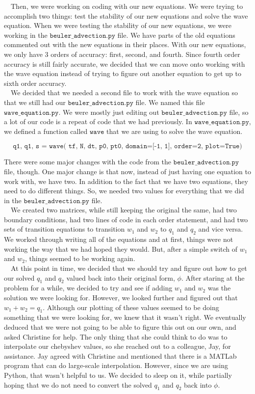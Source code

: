 \documentclass[12pt]{article}
\begin{document}
$\quad$Then, we were working on coding with our new equations. We were trying to accomplish two things: test the stability of our new equations and solve the wave equation. When we were testing the stability of our new equations, we were working in the $\texttt{beuler\_advection.py}$ file. We have parts of the old equations commented out with the new equations in their places. With our new equations, we only have 3 orders of accuracy: first, second, and fourth. Since fourth order accuracy is still fairly accurate, we decided that we can move onto working with the wave equation instead of trying to figure out another equation to get up to sixth order accuracy. \\

$\quad$We decided that we needed a second file to work with the wave equation so that we still had our $\texttt{beuler\_advection.py}$ file. We named this file $\texttt{wave\_equation.py}$. We were mostly just editing out $\texttt{beuler\_advection.py}$ file, so a lot of our code is a repeat of code that we had previously. In $\texttt{wave\_equation.py}$, we defined a function called $\texttt{wave}$ that we are using to solve the wave equation. 

$$\texttt{q1, q1, s = wave( tf, N, dt, p0, pt0,  domain=[-1, 1], order=2, plot=True)}$$ 

There were some major changes with the code from the $\texttt{beuler\_advection.py}$ file, though. One major change is that now, instead of just having one equation to work with, we have two. In addition to the fact that we have two equations, they need to do different things. So, we needed two values for everything that we did in the $\texttt{beuler\_advection.py}$ file. \\
$\quad$We created two matrices, while still keeping the original the same, had two boundary conditions, had two lines of code in each order statement, and had two sets of transition equations to transition $w_1$ and $w_2$ to $q_1$ and $q_2$ and vice versa. We worked through writing all of the equations and at first, things were not working the way that we had hoped they would. But, after a simple switch of $w_1$ and $w_2$, things seemed to be working again. \\
$\quad$At this point in time, we decided that we should try and figure out how to get our solved $q_1$ and $q_2$ valued back into their original form, $\phi$. After staring at the problem for a while, we decided to try and see if adding $w_1$ and $w_2$ was the solution we were looking for. However, we looked further and figured out that $w_1 + w_2 = q_1$. Although our plotting of these values seemed to be doing something that we were looking for, we knew that it wasn't right. We eventually deduced that we were not going to be able to figure this out on our own, and asked Christine for help. The only thing that she could think to do was to interpolate our chebyshev values, so she reached out to a colleague, Jay, for assistance. Jay agreed with Christine and mentioned that there is a MATLab program that can do large-scale interpolation. However, since we are using Python, that wasn't helpful to us. We decided to sleep on it, while partially hoping that we do not need to convert the solved $q_1$ and $q_2$ back into $\phi$.
\end{document}
